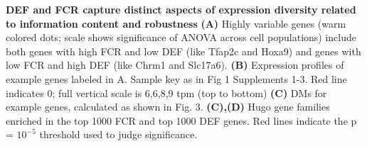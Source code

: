 \textbf{DEF and FCR capture distinct aspects of expression diversity related to information content and robustness} \textbf{(A)} Highly variable genes (warm colored dots; scale shows significance of ANOVA across cell populations) include both genes with high FCR and low DEF (like Tfap2c and Hoxa9) and genes with low FCR and high DEF (like Chrm1 and Slc17a6). \textbf{(B)} Expression profiles of example genes labeled in A. Sample key as in Fig 1 Supplements 1-3. Red line indicates 0; full vertical scale is 6,6,8,9 tpm (top to bottom) \textbf{(C)} DMs for example genes, calculated as shown in Fig. 3. \textbf{(C),(D)} Hugo gene families enriched in the top 1000 FCR and top 1000 DEF genes. Red lines indicate the p = $10^{-5}$ threshold used to judge significance.